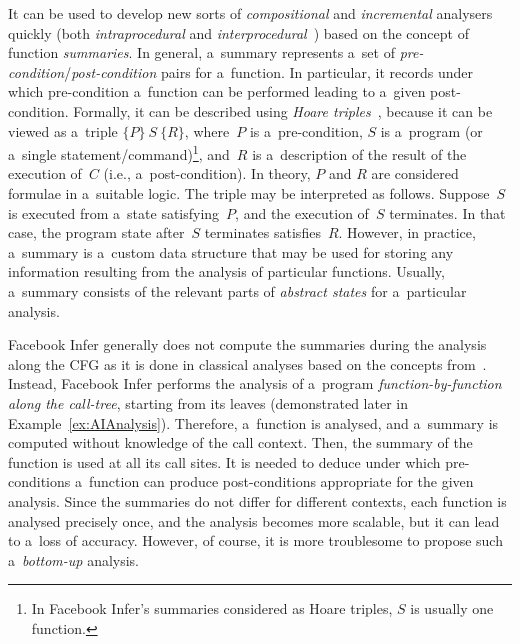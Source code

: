 It can be used to develop new sorts of \emph{compositional} and \emph{incremental} analysers quickly (both \emph{intraprocedural} and \emph{interprocedural}~\cite{programAnalysisNielson}) based on the concept of function \emph{summaries}. In general, a~summary represents a~set of \emph{pre-condition}/\emph{post-condition} pairs for a~function. In particular, it records under which pre-condition a~function can be performed leading to a~given post-condition. Formally, it can be described using \emph{Hoare triples}~\cite{hoare}, because it can be viewed as a~triple $ \{P\}\ S\ \{R\} $, where~$ P $ is a~pre-condition, $ S $ is a~program (or a~single statement/command)\footnote{In Facebook Infer's summaries considered as Hoare triples, $ S $ is usually one function.}, and~$ R $ is a~description of the result of the execution of~$ C $ (i.e., a~post-condition). In theory, $ P $ and $ R $ are considered formulae in a~suitable logic. The triple may be interpreted as follows. Suppose~$ S $ is executed from a~state satisfying~$ P $, and the execution of~$ S $ terminates. In that case, the program state after~$ S $ terminates satisfies~$ R $. However, in practice, a~summary is a~custom data structure that may be used for storing any information resulting from the analysis of particular functions. Usually, a~summary consists of the relevant parts of \emph{abstract states} for a~particular analysis.

Facebook Infer generally does not compute the summaries during the analysis along the CFG as it is done in classical analyses based on the concepts from~\cite{DFAGraphReach, DFAApproaches}. Instead, Facebook Infer performs the analysis of a~program \emph{function-by-function along the call-tree}, starting from its leaves (demonstrated later in Example~\ref{ex:AIAnalysis}). Therefore, a~function is analysed, and a~summary is computed without knowledge of the call context. Then, the summary of the function is used at all its call sites. It is needed to deduce under which pre-conditions a~function can produce post-conditions appropriate for the given analysis. Since the summaries do not differ for different contexts, each function is analysed precisely once, and the analysis becomes more scalable, but it can lead to a~loss of accuracy. However, of course, it is more troublesome to propose such a~\emph{bottom-up} analysis.

